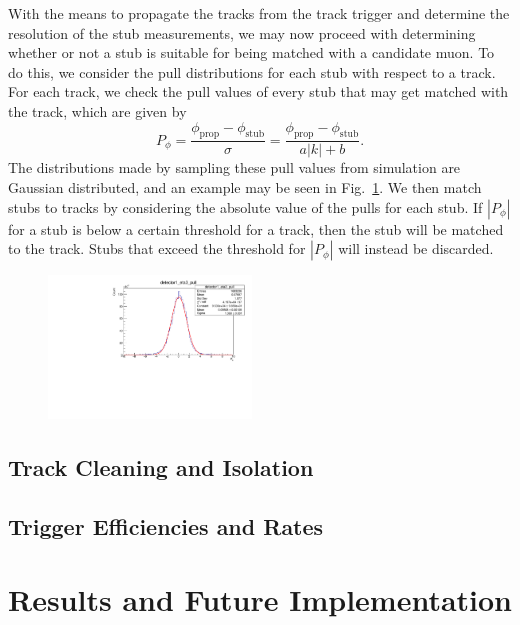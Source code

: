 With the means to propagate the tracks from the track trigger and determine the resolution of the stub measurements, we may now proceed with determining whether or not a stub is suitable for being matched with a candidate muon.
To do this, we consider the pull distributions for each stub with respect to a track.
For each track, we check the pull values of every stub that may get matched with the track, which are given by
\begin{equation}
  P_\phi=\frac{\phi_\mathrm{prop}-\phi_\mathrm{stub}}{\sigma}=\frac{\phi_\mathrm{prop}-\phi_\mathrm{stub}}{a|k|+b}.
\end{equation}
The distributions made by sampling these pull values from simulation are Gaussian distributed, and an example may be seen in Fig.~\ref{fig:deltaPhiPull}.
We then match stubs to tracks by considering the absolute value of the pulls for each stub.
If $|P_\phi|$ for a stub is below a certain threshold for a track, then the stub will be matched to the track.
Stubs that exceed the threshold for $|P_\phi|$ will instead be discarded.

\begin{figure}[htbp]
  \centering
  \includegraphics[width=0.48\textwidth]{fig/TPS/deltaPhi_pull.pdf}
  \caption{}
  \label{fig:deltaPhiPull}
\end{figure}


\subsection{Track Cleaning and Isolation}
\label{subsec:cleaning}

\begin{figure}[htbp]
  \centering
  
  \caption{}
  \label{fig:clean}
\end{figure}

\begin{figure}[htbp]
  \centering
  
  \caption{}
  \label{fig:isol}
\end{figure}

\subsection{Trigger Efficiencies and Rates}
\label{subsec:rates}

\section{Results and Future Implementation}
\label{subsec:TPSResults}
